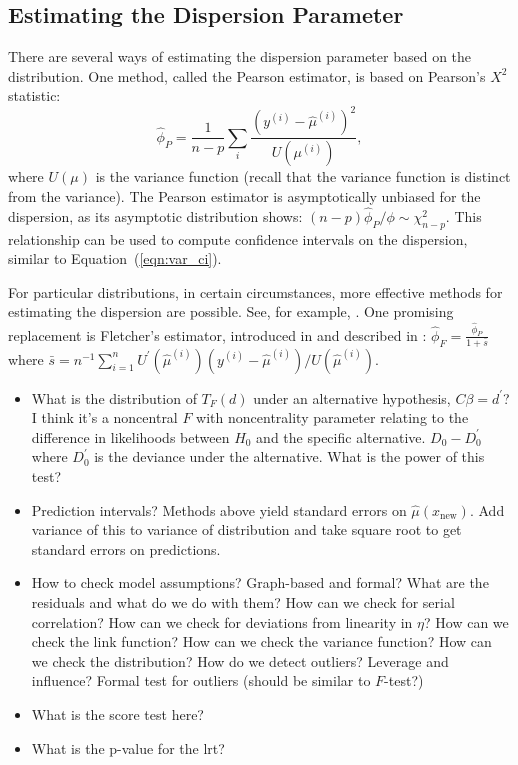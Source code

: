 \documentclass[12pt]{article}
\begin{document}
\subsection{Estimating the Dispersion Parameter}
There are several ways of estimating the dispersion parameter based on the distribution. One method, called the Pearson estimator, is based on Pearson's $X^2$ statistic:
\begin{displaymath}
   \hat{\phi}_P = \frac{1}{n-p} \sum_i \frac{(y^{(i)} - \hat{\mu}^{(i)})^2}{U(\mu^{(i)})},
\end{displaymath}
where $U(\mu)$ is the variance function (recall that the variance function is distinct from the variance). The Pearson estimator is asymptotically unbiased for the dispersion, as its asymptotic distribution shows: $(n-p)\hat{\phi}_P / \phi \sim \chi_{n-p}^2$. This relationship can be used to compute confidence intervals on the dispersion, similar to Equation~(\ref{eqn:var_ci}).

For particular distributions, in certain circumstances, more effective methods for estimating the dispersion are possible. See, for example, \cite[\S 4.5.2, \S 6.2.4, and \S 8.3.6]{MN:1983}. One promising replacement is Fletcher's estimator, introduced in \cite{Fletcher:12} and described in \cite[\S 3.1.5]{Wood:2017}: $\hat{\phi}_F = \frac{\hat{\phi}_P}{1 + \bar{s}}$ where $\bar{s}=n^{-1} \sum_{i=1}^n U^\prime(\hat{\mu}^{(i)}) (y^{(i)} - \hat{\mu}^{(i)})/U(\hat{\mu}^{(i)})$.

\begin{itemize}
\item What is the distribution of $T_F(d)$ under an alternative hypothesis, $C \beta = d^\prime$? I think it's a noncentral $F$ with noncentrality parameter relating to the difference in likelihoods between $H_0$ and the specific alternative. $D_0 - D_0^\prime$ where $D_0^\prime$ is the deviance under the alternative. What is the power of this test?
\item Prediction intervals? Methods above yield standard errors on $\hat{\mu}(x_\textrm{new})$. Add variance of this to variance of distribution and take square root to get standard errors on predictions.
\item How to check model assumptions? Graph-based and formal? What are the residuals and what do we do with them? How can we check for serial correlation? How can we check for deviations from linearity in $\eta$? How can we check the link function? How can we check the variance function? How can we check the distribution? How do we detect outliers? Leverage and influence? Formal test for outliers (should be similar to $F$-test?)
\item What is the score test here?
\item What is the p-value for the lrt?
\end{itemize}
\end{document}
